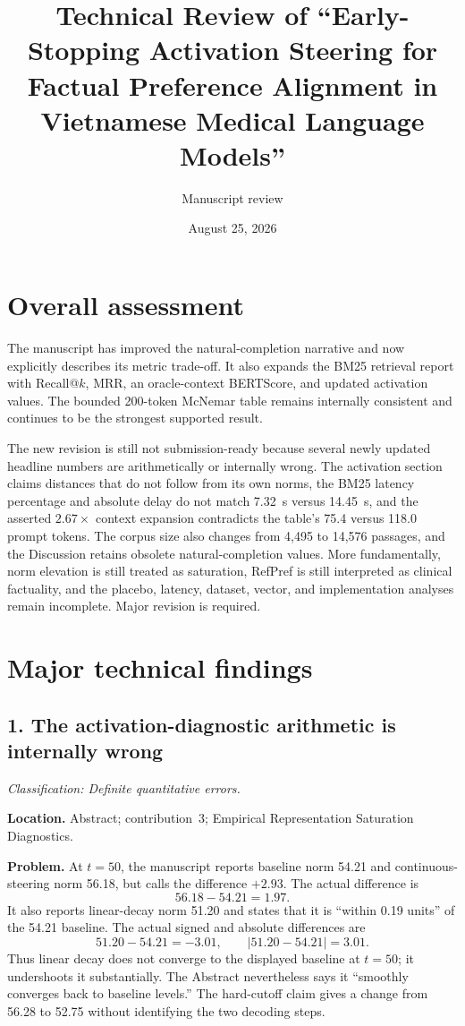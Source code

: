 \documentclass[11pt]{article}
\title{Technical Review of ``Early-Stopping Activation Steering for Factual Preference Alignment in Vietnamese Medical Language Models''}
\author{Manuscript review}
\date{August 25, 2026}
\newcommand{\findinglabel}[1]{\textbf{#1}}
\newcommand{\classification}[1]{\textit{Classification: #1.}}
\begin{document}
\maketitle

\section*{Overall assessment}

The manuscript has improved the natural-completion narrative and now explicitly describes its metric trade-off.  It also expands the BM25 retrieval report with Recall@$k$, MRR, an oracle-context BERTScore, and updated activation values.  The bounded 200-token McNemar table remains internally consistent and continues to be the strongest supported result.

The new revision is still not submission-ready because several newly updated headline numbers are arithmetically or internally wrong.  The activation section claims distances that do not follow from its own norms, the BM25 latency percentage and absolute delay do not match 7.32~s versus 14.45~s, and the asserted $2.67\times$ context expansion contradicts the table's 75.4 versus 118.0 prompt tokens.  The corpus size also changes from 4,495 to 14,576 passages, and the Discussion retains obsolete natural-completion values.  More fundamentally, norm elevation is still treated as saturation, RefPref is still interpreted as clinical factuality, and the placebo, latency, dataset, vector, and implementation analyses remain incomplete.  Major revision is required.

\section*{Major technical findings}

\subsection*{1. The activation-diagnostic arithmetic is internally wrong}

\classification{Definite quantitative errors}

\findinglabel{Location.} Abstract; contribution~3; Empirical Representation Saturation Diagnostics.

\findinglabel{Problem.} At $t=50$, the manuscript reports baseline norm 54.21 and continuous-steering norm 56.18, but calls the difference $+2.93$.  The actual difference is
\[
56.18-54.21=1.97.
\]
It also reports linear-decay norm 51.20 and states that it is ``within 0.19 units'' of the 54.21 baseline.  The actual signed and absolute differences are
\[
51.20-54.21=-3.01,
\qquad
|51.20-54.21|=3.01.
\]
Thus linear decay does not converge to the displayed baseline at $t=50$; it undershoots it substantially.  The Abstract nevertheless says it ``smoothly converges back to baseline levels.''  The hard-cutoff claim gives a change from 56.28 to 52.75 without identifying the two decoding steps.
\end{document}
